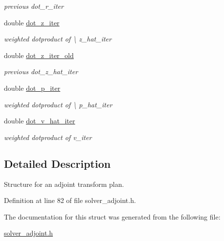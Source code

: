 \begin{DoxyCompactItemize}
\begin{DoxyCompactList}\small\item\em previous dot\-\_\-r\-\_\-iter \end{DoxyCompactList}\item 
\hypertarget{structinfst__adjoint__plan_a2309d1161fdf96711f3251e41a65eef0}{double \hyperlink{structinfst__adjoint__plan_a2309d1161fdf96711f3251e41a65eef0}{dot\-\_\-z\-\_\-iter}}\label{structinfst__adjoint__plan_a2309d1161fdf96711f3251e41a65eef0}

\begin{DoxyCompactList}\small\item\em weighted dotproduct of \textbackslash{} z\-\_\-hat\-\_\-iter \end{DoxyCompactList}\item 
\hypertarget{structinfst__adjoint__plan_a9bdd6b4dfcb1b22bd010444ef34b5903}{double \hyperlink{structinfst__adjoint__plan_a9bdd6b4dfcb1b22bd010444ef34b5903}{dot\-\_\-z\-\_\-iter\-\_\-old}}\label{structinfst__adjoint__plan_a9bdd6b4dfcb1b22bd010444ef34b5903}

\begin{DoxyCompactList}\small\item\em previous dot\-\_\-z\-\_\-hat\-\_\-iter \end{DoxyCompactList}\item 
\hypertarget{structinfst__adjoint__plan_a6dfb17d6feade963b31c16e6278aa6ee}{double \hyperlink{structinfst__adjoint__plan_a6dfb17d6feade963b31c16e6278aa6ee}{dot\-\_\-p\-\_\-iter}}\label{structinfst__adjoint__plan_a6dfb17d6feade963b31c16e6278aa6ee}

\begin{DoxyCompactList}\small\item\em weighted dotproduct of \textbackslash{} p\-\_\-hat\-\_\-iter \end{DoxyCompactList}\item 
\hypertarget{structinfst__adjoint__plan_ab4e8f85dfe25ba2b90f86d7d39362e5c}{double \hyperlink{structinfst__adjoint__plan_ab4e8f85dfe25ba2b90f86d7d39362e5c}{dot\-\_\-v\-\_\-hat\-\_\-iter}}\label{structinfst__adjoint__plan_ab4e8f85dfe25ba2b90f86d7d39362e5c}

\begin{DoxyCompactList}\small\item\em weighted dotproduct of v\-\_\-iter \end{DoxyCompactList}\end{DoxyCompactItemize}


\subsection{Detailed Description}
Structure for an adjoint transform plan. 

Definition at line 82 of file solver\-\_\-adjoint.\-h.



The documentation for this struct was generated from the following file\-:\begin{DoxyCompactItemize}
\item 
\hyperlink{solver__adjoint_8h}{solver\-\_\-adjoint.\-h}\end{DoxyCompactItemize}
